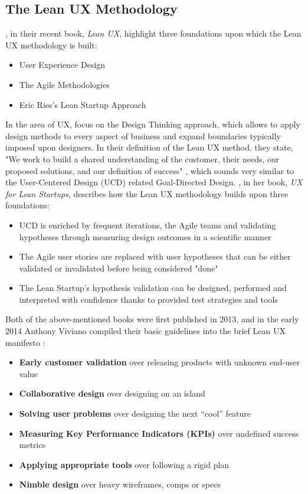 \documentclass{article}
\begin{document}
\subsection{The Lean UX Methodology}
\citeauthor{gothelf2016lean}, in their recent book, \textit{Lean UX}, \citep{gothelf2016lean} highlight three foundations upon which the Lean UX methodology is built:
\begin{itemize}
  \item User Experience Design
  \item The Agile Methodologies
  \item Eric Ries's Lean Startup Approach
\end{itemize}
In the area of UX, \citeauthor{gothelf2016lean} focus on the Design Thinking approach, which allows to apply design methods to every aspect of business and expand boundaries typically imposed upon designers. In their definition of the Lean UX method, they state, "We work to build a shared understanding of the customer, their needs, our proposed solutions, and our definition of success" \citep[29]{gothelf2016lean}, which sounds very similar to the User-Centered Design (UCD) related Goal-Directed Design.
\cite{klein2013ux}, in her book, \textit{UX for Lean Startups}, describes how the Lean UX methodology builds upon three foundations:
\begin{itemize}
  \item UCD is enriched by frequent iterations, the Agile teams and validating hypotheses through measuring design outcomes in a scientific manner
  \item The Agile user stories are replaced with user hypotheses that can be either validated or invalidated before being considered "done"
  \item The Lean Startup's hypothesis validation can be designed, performed and interpreted with confidence thanks to provided test strategies and tools
\end{itemize}
Both of the above-mentioned books were first published in 2013, and in the early 2014 Anthony Viviano compiled their basic guidelines into the brief Lean UX manifesto \citep{viviano2014lean}:
\begin{itemize}
  \item \textbf{Early customer validation} over releasing products with unknown end-user value
  \item \textbf{Collaborative design} over designing on an island
  \item \textbf{Solving user problems} over designing the next “cool” feature
  \item \textbf{Measuring Key Performance Indicators (KPIs)} over undefined success metrics
  \item \textbf{Applying appropriate tools} over following a rigid plan
  \item \textbf{Nimble design} over heavy wireframes, comps or specs
\end{itemize}
\end{document}
